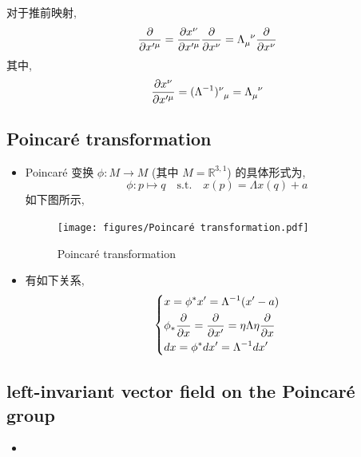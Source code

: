 \documentclass[10pt, a4paper]{article}
\numberwithin{equation}{section}
\begin{document}
\begin{itemize}
		\begin{tcolorbox}[title=calculation:]
			对于推前映射,
			\begin{equation}
				\frac{\partial}{\partial x'^\mu} = \frac{\partial x^\nu}{\partial x'^\mu} \frac{\partial}{\partial x^\nu} = \tensor{\Lambda}{_\mu^\nu} \frac{\partial}{\partial x^\nu}
			\end{equation}
			其中,
			\begin{equation}
				\frac{\partial x^\nu}{\partial x'^\mu} = \tensor{(\Lambda^{- 1})}{^\nu_\mu} = \tensor{\Lambda}{_\mu^\nu}
			\end{equation}
		\end{tcolorbox}
	\end{itemize}
	
	\subsection{Poincaré transformation}
	\begin{itemize}
		\item Poincaré 变换 $\phi : M \rightarrow M$ (其中 $M = \mathbb{R}^{3, 1}$) 的具体形式为,
		\begin{equation}
			\phi : p \mapsto q \quad \text{s.t.} \quad x(p) = \Lambda x(q) + a
		\end{equation}
		如下图所示,
		
		\begin{figure}[H]
			\centering
			\texttt{[image: figures/Poincaré transformation.pdf]}
			\caption{Poincaré transformation}
		\end{figure}
		
		\item 有如下关系,
		\begin{equation}
			\begin{dcases}
				x = \phi^* x' = \Lambda^{- 1} (x' - a) \\
				\phi_* \frac{\partial}{\partial x} = \frac{\partial}{\partial x'} = \eta \Lambda \eta \frac{\partial}{\partial x} \\
				dx = \phi^* dx' = \Lambda^{- 1} dx'
			\end{dcases}
		\end{equation}
	\end{itemize}
	
	\subsection{left-invariant vector field on the Poincaré group}
	\begin{itemize}
		\item 
	\end{itemize}
\end{document}
